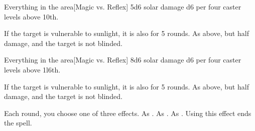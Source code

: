 \begin{spellheader}
\end{spellheader}
\begin{spelleffects}
    \begin{spelltarget}{Everything in the area}[Magic vs. Reflex]
        \spellsuccess 5d6 solar damage \add d6 per four caster levels above 10th.

        If the target is vulnerable to sunlight, it is also \blinded for 5 rounds.
        \spellfailure As above, but half damage, and the target is not blinded.
    \end{spelltarget}
\end{spelleffects}

\begin{spellheader}
\end{spellheader}
\begin{spelleffects}
    \begin{spelltarget}{Everything in the area}[Magic vs. Reflex]
        \spellsuccess 8d6 solar damage \add d6 per four caster levels above 1l6th.

        If the target is vulnerable to sunlight, it is also \blinded for 5 rounds.
        \spellfailure As above, but half damage, and the target is not blinded.
    \end{spelltarget}
\end{spelleffects}

\begin{comment}
\subsubsection{T}
\end{comment}

\begin{spellheader}
    \spellrng{\rngmed}
\end{spellheader}
\begin{spelleffects}
    \spellspecial Each round, you choose one of three effects.
     As .
     As .
     As . Using this effect ends the spell.
\end{spelleffects}

